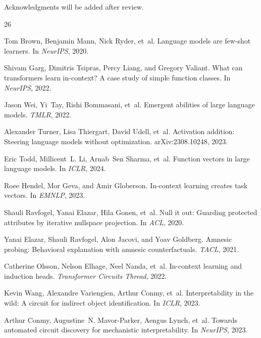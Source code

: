 \documentclass[sigconf,anonymous]{acmart}
\begin{document}
\begin{acks}
Acknowledgments will be added after review.
\end{acks}


\begin{thebibliography}{26}

Tom Brown, Benjamin Mann, Nick Ryder, et~al.
\newblock Language models are few-shot learners.
\newblock In \emph{NeurIPS}, 2020.

Shivam Garg, Dimitris Tsipras, Percy Liang, and Gregory Valiant.
\newblock What can transformers learn in-context? A case study of simple function classes.
\newblock In \emph{NeurIPS}, 2022.

Jason Wei, Yi~Tay, Rishi Bommasani, et~al.
\newblock Emergent abilities of large language models.
\newblock \emph{TMLR}, 2022.

Alexander Turner, Lisa Thiergart, David Udell, et~al.
\newblock Activation addition: Steering language models without optimization.
\newblock arXiv:2308.10248, 2023.

Eric Todd, Millicent~L. Li, Arnab~Sen Sharma, et~al.
\newblock Function vectors in large language models.
\newblock In \emph{ICLR}, 2024.

Roee Hendel, Mor Geva, and Amir Globerson.
\newblock In-context learning creates task vectors.
\newblock In \emph{EMNLP}, 2023.

Shauli Ravfogel, Yanai Elazar, Hila Gonen, et~al.
\newblock Null it out: Guarding protected attributes by iterative nullspace projection.
\newblock In \emph{ACL}, 2020.

Yanai Elazar, Shauli Ravfogel, Alon Jacovi, and Yoav Goldberg.
\newblock Amnesic probing: Behavioral explanation with amnesic counterfactuals.
\newblock \emph{TACL}, 2021.

Catherine Olsson, Nelson Elhage, Neel Nanda, et~al.
\newblock In-context learning and induction heads.
\newblock \emph{Transformer Circuits Thread}, 2022.

Kevin Wang, Alexandre Variengien, Arthur Conmy, et~al.
\newblock Interpretability in the wild: A circuit for indirect object identification.
\newblock In \emph{ICLR}, 2023.

Arthur Conmy, Augustine~N. Mavor-Parker, Aengus Lynch, et~al.
\newblock Towards automated circuit discovery for mechanistic interpretability.
\newblock In \emph{NeurIPS}, 2023.


\end{thebibliography}
\end{document}

